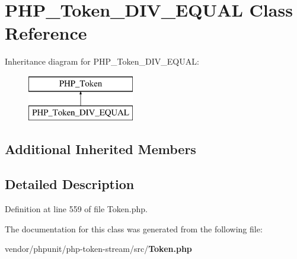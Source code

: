 \section{P\+H\+P\+\_\+\+Token\+\_\+\+D\+I\+V\+\_\+\+E\+Q\+U\+A\+L Class Reference}
\label{class_p_h_p___token___d_i_v___e_q_u_a_l}
Inheritance diagram for P\+H\+P\+\_\+\+Token\+\_\+\+D\+I\+V\+\_\+\+E\+Q\+U\+A\+L\+:\begin{figure}[H]
\begin{center}
\leavevmode
\includegraphics[height=2.000000cm]{class_p_h_p___token___d_i_v___e_q_u_a_l}
\end{center}
\end{figure}
\subsection*{Additional Inherited Members}


\subsection{Detailed Description}


Definition at line 559 of file Token.\+php.



The documentation for this class was generated from the following file\+:\begin{DoxyCompactItemize}
\item 
vendor/phpunit/php-\/token-\/stream/src/{\bf Token.\+php}\end{DoxyCompactItemize}
